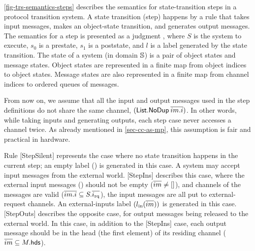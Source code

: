 \autoref{fig-trs-semantics-steps} describes the semantics for state-transition steps in a protocol transition system.
A state transition (step) happens by a rule that takes input messages, makes an object-state transition, and generates output messages.
The semantics for a step is presented as a judgment , where $S$ is the system to execute, $s_0$ is a prestate, $s_1$ is a poststate, and $l$ is a label generated by the state transition.
The state of a system (in domain $\mathbb{S}{}$) is a pair of object states and message states.
Object states are represented in a finite map from object indices to object states.
Message states are also represented in a finite map from channel indices to ordered queues of messages.

From now on, we assume that all the input and output messages used in the step definitions do not share the same channel, \ie{} $(\textsf{List.NoDup}\: \overline{im.i})$.
In other words, while taking inputs and generating outputs, each step case never accesses a channel twice.
As already mentioned in \autoref{sec-cc-as-mp}, this assumption is fair and practical in hardware.

Rule [StepSilent] represents the case where no state transition happens in the current step; an empty label (\lblEmpty{}) is generated in this case.
A system may accept input messages from the external world.
[StepIns] describes this case, where the external input messages () should not be empty ($\overline{im} \neq \lbrack\rbrack$), and channels of the messages are valid ($\overline{im.i} \subseteq S.\overline{i_{\textrm{rq}}}$), \ie{} the input messages are all put to external-request channels.
An external-inputs label $(l_{\textrm{in}}(\overline{im}))$ is generated in this case.
[StepOuts] describes the opposite case, for output messages being released to the external world.
In this case, in addition to the [StepIns] case, each output message should be in the head (the first element) of its residing channel ($\overline{im} \subseteq M.\textsf{hds}$).

